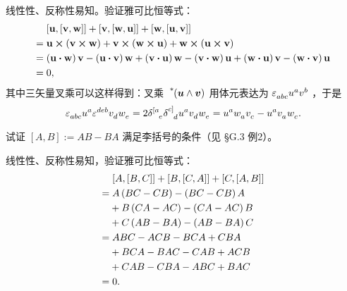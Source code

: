 \begin{xiti}
    \begin{zm}
    	线性性、反称性易知。验证雅可比恒等式：
    	\begin{align*}
    	&\tmu \left[\myvec{u},\left[\myvec{v},\myvec{w}\right]\right] + \left[\myvec{v},\left[\myvec{w},\myvec{u}\right]\right] + \left[\myvec{w},\left[\myvec{u},\myvec{v}\right]\right]\\
    	=&\;\myvec{u} \cp \left( \myvec{v} \cp \myvec{w} \right) + \myvec{v} \cp \left( \myvec{w} \cp \myvec{u} \right) + \myvec{w} \cp \left( \myvec{u} \cp \myvec{v} \right)\\
    	=&\tmu\left(\myvec{u} \vdot \myvec{w}\right) \myvec{v} - \left(\myvec{u} \vdot \myvec{v}\right) \myvec{w} + \left(\myvec{v} \vdot \myvec{u}\right) \myvec{w} - \left(\myvec{v} \vdot \myvec{w}\right) \myvec{u} + \left(\myvec{w} \vdot \myvec{u}\right) \myvec{v} - \left(\myvec{w} \vdot \myvec{v}\right) \myvec{u}\\
    	=&\;0,
    	\end{align*}
    	其中三矢量叉乘可以这样得到：叉乘 $\tensor[^*]{\left(\bm{u}\wedge\bm{v}\right)}{}$ 用体元表达为 $\tensor{\varepsilon}{_a_b_c} \tensor{u}{^a} \tensor{v}{^b}$ ，于是
    	\begin{displaymath}
    	\tensor{\varepsilon}{_a_b_c} \tensor{u}{^a} \tensor{\varepsilon}{^d^e^b} \tensor{v}{_d} \tensor{w}{_e} = 2 \tensor{\delta}{^{[a}_e} \tensor{\delta}{^{c]}_d} \tensor{u}{^a} \tensor{v}{_d} \tensor{w}{_e} = \tensor{u}{^a} \tensor{w}{_a} \tensor{v}{_c} - \tensor{u}{^a} \tensor{v}{_a} \tensor{w}{_c}.
    	\end{displaymath}
    \end{zm}

    \item 试证 $\left[A,B\right] := AB-BA$ 满足李括号的条件（见 \S G.3 例2）。
    
    \begin{zm}
    	线性性、反称性易知，验证雅可比恒等式：
    	\begin{align*}
    	&\mspace{2mu}\left[A,\left[B,C\right]\right] + \left[B,\left[C,A\right]\right] + \left[C,\left[A,B\right]\right]\\
    	=&\;A \left(BC-CB\right) - \left(BC-CB\right) A \\
    	&+ B \left(CA-AC\right) - \left(CA-AC\right) B \\
    	&+ C \left(AB-BA\right) - \left(AB-BA\right) C\\
    	=&\;ABC-ACB-BCA+CBA\\
    	&+ BCA-BAC-CAB+ACB\\
    	&+CAB-CBA-ABC+BAC\\
    	=&\;0.
    	\end{align*}
    \end{zm}
    

\end{xiti}
